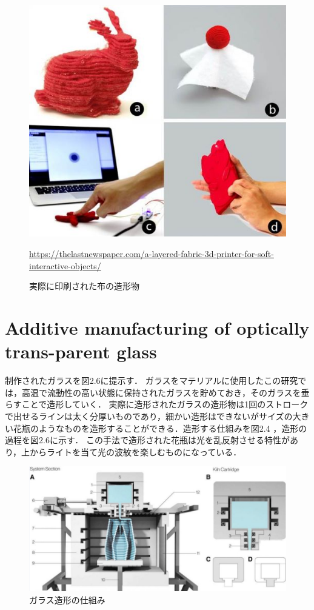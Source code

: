 \begin{figure}[H]
  \centering
  \includegraphics[width=10truecm]{./fig/ALayered.jpg}
  \caption{実際に印刷された布の造形物}
  \url{https://thelastnewspaper.com/a-layered-fabric-3d-printer-for-soft-interactive-objects/} %
  \label{fig:ferret}
\end{figure}



\section{ Additive manufacturing of optically trans-parent glass\cite{d}}
\label{sec:enum}
制作されたガラスを図2.6に提示す．
ガラスをマテリアルに使用したこの研究では，高温で流動性の高い状態に保持されたガラスを貯めておき，そのガラスを垂らすことで造形していく．
実際に造形されたガラスの造形物は1回のストロークで出せるラインは太く分厚いものであり，細かい造形はできないがサイズの大きい花瓶のようなものを造形することができる．造形する仕組みを図2.4 ，造形の過程を図2.6に示す．
この手法で造形された花瓶は光を乱反射させる特性があり，上からライトを当て光の波紋を楽しむものになっている．

\begin{figure}[H]
  \centering
  \includegraphics[width=12.5truecm]{./fig/Additive2.jpg}
  \caption{ガラス造形の仕組み}
  \label{fig:ferret}
\end{figure}

